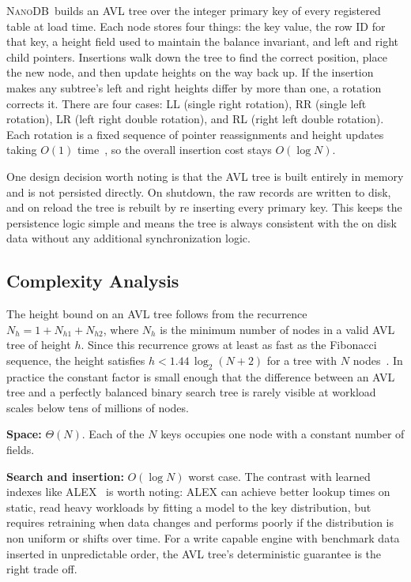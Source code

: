 \documentclass[conference]{IEEEtran}
\newcommand{\NanoDB}{\textsc{NanoDB}}
\begin{document}
\NanoDB\ builds an AVL tree over the integer primary key of every registered
table at load time. Each node stores four things: the key value, the row ID for
that key, a height field used to maintain the balance invariant, and left and
right child pointers. Insertions walk down the tree to find the correct position,
place the new node, and then update heights on the way back up. If the insertion
makes any subtree's left and right heights differ by more than one, a rotation
corrects it. There are four cases: LL (single right rotation), RR (single left
rotation), LR (left right double rotation), and RL (right left double rotation).
Each rotation is a fixed sequence of pointer reassignments and height updates
taking $O(1)$ time~\cite{cormen2022}, so the overall insertion cost stays $O(\log
N)$.

One design decision worth noting is that the AVL tree is built entirely in memory
and is not persisted directly. On shutdown, the raw records are written to disk,
and on reload the tree is rebuilt by re inserting every primary key. This keeps
the persistence logic simple and means the tree is always consistent with the
on disk data without any additional synchronization logic.

\subsection{Complexity Analysis}

The height bound on an AVL tree follows from the recurrence $N_h = 1 + N_{h 1} +
N_{h 2}$, where $N_h$ is the minimum number of nodes in a valid AVL tree of
height $h$. Since this recurrence grows at least as fast as the Fibonacci
sequence, the height satisfies $h < 1.44\,\log_2(N+2)$ for a tree with $N$
nodes~\cite{cormen2022}. In practice the constant factor is small enough that the
difference between an AVL tree and a perfectly balanced binary search tree is
rarely visible at workload scales below tens of millions of nodes.

\textbf{Space:} $\Theta(N)$. Each of the $N$ keys occupies one node with a
constant number of fields.

\textbf{Search and insertion:} $O(\log N)$ worst case. The contrast with learned
indexes like ALEX~\cite{ding2020} is worth noting: ALEX can achieve better lookup
times on static, read heavy workloads by fitting a model to the key distribution,
but requires retraining when data changes and performs poorly if the distribution
is non uniform or shifts over time. For a write capable engine with benchmark data
inserted in unpredictable order, the AVL tree's deterministic guarantee is the
right trade off.
\end{document}
